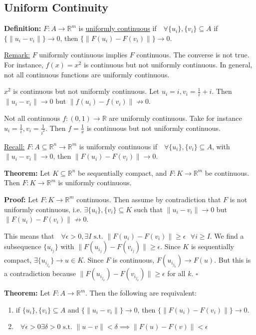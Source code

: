 \documentclass{article}
\newcommand*{\qed}{\hfill$\square$}%
\newcommand*{\txt}[1]{\text{ #1 }}%
\newcommand*{\fora}{\txt{}\forall}%
\newcommand*{\rr}{\mathbb{R}}%
\begin{document}
\subsection{Uniform Continuity}

\textbf{Definition:} $F:A\to \rr^m$ is \underline{uniformly continuous} if $\fora \{u_i\},\{v_i\}\subseteq A$ if $\{\|u_i-v_i\|\}\to 0$, then $\{\|F(u_i)-F(v_i)\|\}\to 0$.

\underline{Remark:} $F$ uniformly continuous implies $F$ continuous. The converse is not true. For instance, $f(x)=x^2$ is continuous but not uniformly continuous. In general, not all continuous functions are uniformly continuous.

$x^2$ is continuous but not uniformly continuous. Let $u_i=i, v_i=\frac{1}{i}+i$. Then $\|u_i-v_i\|\to 0$ but $\|f(u_i)-f(v_i)\|\not\to 0$.

Not all continuous $f:(0,1)\to \mathbb{R}$ are uniformly continuous. Take for instance $u_i=\frac{1}{i},v_i=\frac{1}{i^2}$. Then $f=\frac{1}{x}$ is continuous but not uniformly continuous.

\underline{Recall:} $F:A\subseteq \rr^n\to \rr^m$ is uniformly continuous if $\fora \{u_i\},\{v_i\}\subseteq A$, with $\|u_i-v_i\|\to 0$, then $\|F(u_i)-F(v_i)\|\to 0$.

\textbf{Theorem:} Let $K\subseteq \rr^n$ be sequentially compact, and $F:K\to \rr^m$ be continuous. Then $F:K\to \rr^m$ is uniformly continuous.

\textbf{Proof:} Let $F:K\to \rr^m$ continuous. Then assume by contradiction that $F$ is not uniformly continuous, i.e. $\exists \{u_i\}, \{v_i\}\subseteq K$ such that $\|u_i-v_i\|\to 0$ but $\|F(u_i)-F(v_i)\|\not\to 0$.

This means that $\fora \epsilon>0,\exists I\txt{s.t.}\|F(u_i)-F(v_i)\|\geq \epsilon\fora i\geq I$. We find a subsequence $\{u_{i_j}\}$ with $\|F(u_{i_j})-F(v_{i_j})\|\geq \epsilon$. Since $K$ is sequentially compact, $\exists \{u_{i_{j_k}}\}\to u\in K$. Since $F$ is continuous, $F(u_{i_{j_k}})\to F(u)$. But this is a contradiction because $\|F(u_{i_{j_k}})-F(v_{i_{j_k}})\|\geq \epsilon$ for all $k$. \qed

\textbf{Theorem:} Let $F:A\to \rr^m$. Then the following are requivalent:\begin{enumerate}
    \item if $\{u_i\},\{v_i\}\subseteq A$ and $\{\|u_i-v_i\|\}\to 0$, then $\{\|F(u_i)-F(v_i)\|\}\to 0$.
    \item $\fora \epsilon>0\exists \delta>0\txt{s.t.}\|u-v\|<\delta\implies \|F(u)-F(v)\|<\epsilon$
\end{enumerate}
\end{document}
